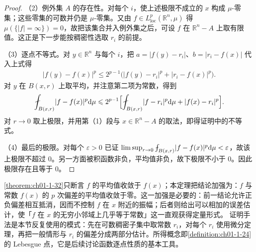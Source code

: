 \documentclass[../../main.tex]{subfiles}%
\begin{document}
\begin{proof}
（2）例外集 $A$ 的存在性。对每个 $i$，使上述极限不成立的 $x$ 构成 $\mu$-零集；这些零集的可数并仍是 $\mu$-零集。又由 $f\in L^{p}_{\mathrm{loc}}(\mathbb{R}^n,\mu)$ 得 $\mu(\{\lvert f\rvert=\infty\})=0$，故把该集合并入例外集之后，可设 $f$ 在 $\mathbb{R}^n-A$ 上取有限值。这正是下一步能按稠密性选取 $r_i$ 的前提。

（3）逐点不等式。对 $y\in\mathbb{R}^n$ 与每个 $i$，把 $a=\lvert f(y)-r_i\rvert$、$b=\lvert r_i-f(x)\rvert$ 代入上式得
\begin{align*}
\lvert f(y)-f(x)\rvert^{p}\leqslant2^{p-1}\bigl(\lvert f(y)-r_i\rvert^{p}+\lvert r_i-f(x)\rvert^{p}\bigr).
\end{align*}
对 $y$ 在 $B(x,r)$ 上取平均，并注意第二项为常数，得到
\begin{align*}
\fint_{B(x,r)}\lvert f-f(x)\rvert^{p}\diff\mu
\leqslant2^{p-1}\Bigl[\fint_{B(x,r)}\lvert f-r_i\rvert^{p}\diff\mu+\lvert f(x)-r_i\rvert^{p}\Bigr].
\end{align*}
对 $r\to0$ 取上极限，并用第（1）段与 $x\in\mathbb{R}^n-A$ 的取法，即得证明中的不等式。

（4）最后的极限。对每个 $\varepsilon>0$ 已证 $\limsup_{r\to0}\fint_{B(x,r)}\lvert f-f(x)\rvert^{p}\diff\mu<\varepsilon$，故该上极限不超过 $0$。另一方面被积函数非负，平均值非负，故下极限不小于 $0$。因此极限存在且等于 $0$。
\end{proof}

\begin{remark}\label{remark:ch01-def-1-24-动机}
\cref{theorem:ch01-1-32}只断言 $f$ 的平均值收敛于 $f(x)$；本定理把结论加强为：$f$ 与常数 $f(x)$ 的 $p$ 次偏差的平均值收敛于零。这一加强是必要的：前一结论允许正负偏差相互抵消，因而不控制 $f$ 在 $x$ 附近的振幅；后者则给出可以相加的误差估计，使「$f$ 在 $x$ 的无穷小邻域上几乎等于常数」这一直观获得定量形式。%
证明手法是本节反复使用的模式：先在可数稠密子集中取常数 $r_i$，对每个 $r_i$ 使用微分定理，再把一般情形与 $r_i$ 的偏差分成两部分估计。所得概念即\cref{definition:ch01-1-24}的 Lebesgue 点，它是后续讨论函数逐点性质的基本工具。%
\end{remark}
\end{document}
